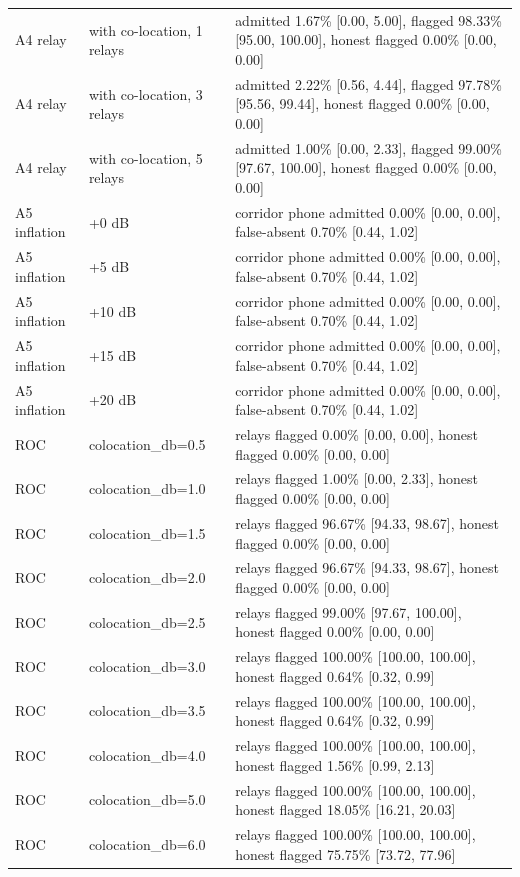 \begin{table}[t]
\begin{tabular}{lll}
A4 relay & with co-location, 1 relays & admitted 1.67\% [0.00, 5.00], flagged 98.33\% [95.00, 100.00], honest flagged 0.00\% [0.00, 0.00] \\
A4 relay & with co-location, 3 relays & admitted 2.22\% [0.56, 4.44], flagged 97.78\% [95.56, 99.44], honest flagged 0.00\% [0.00, 0.00] \\
A4 relay & with co-location, 5 relays & admitted 1.00\% [0.00, 2.33], flagged 99.00\% [97.67, 100.00], honest flagged 0.00\% [0.00, 0.00] \\
A5 inflation & +0 dB & corridor phone admitted 0.00\% [0.00, 0.00], false-absent 0.70\% [0.44, 1.02] \\
A5 inflation & +5 dB & corridor phone admitted 0.00\% [0.00, 0.00], false-absent 0.70\% [0.44, 1.02] \\
A5 inflation & +10 dB & corridor phone admitted 0.00\% [0.00, 0.00], false-absent 0.70\% [0.44, 1.02] \\
A5 inflation & +15 dB & corridor phone admitted 0.00\% [0.00, 0.00], false-absent 0.70\% [0.44, 1.02] \\
A5 inflation & +20 dB & corridor phone admitted 0.00\% [0.00, 0.00], false-absent 0.70\% [0.44, 1.02] \\
ROC & colocation\_db=0.5 & relays flagged 0.00\% [0.00, 0.00], honest flagged 0.00\% [0.00, 0.00] \\
ROC & colocation\_db=1.0 & relays flagged 1.00\% [0.00, 2.33], honest flagged 0.00\% [0.00, 0.00] \\
ROC & colocation\_db=1.5 & relays flagged 96.67\% [94.33, 98.67], honest flagged 0.00\% [0.00, 0.00] \\
ROC & colocation\_db=2.0 & relays flagged 96.67\% [94.33, 98.67], honest flagged 0.00\% [0.00, 0.00] \\
ROC & colocation\_db=2.5 & relays flagged 99.00\% [97.67, 100.00], honest flagged 0.00\% [0.00, 0.00] \\
ROC & colocation\_db=3.0 & relays flagged 100.00\% [100.00, 100.00], honest flagged 0.64\% [0.32, 0.99] \\
ROC & colocation\_db=3.5 & relays flagged 100.00\% [100.00, 100.00], honest flagged 0.64\% [0.32, 0.99] \\
ROC & colocation\_db=4.0 & relays flagged 100.00\% [100.00, 100.00], honest flagged 1.56\% [0.99, 2.13] \\
ROC & colocation\_db=5.0 & relays flagged 100.00\% [100.00, 100.00], honest flagged 18.05\% [16.21, 20.03] \\
ROC & colocation\_db=6.0 & relays flagged 100.00\% [100.00, 100.00], honest flagged 75.75\% [73.72, 77.96] \\
\bottomrule
\end{tabular}
\end{table}
